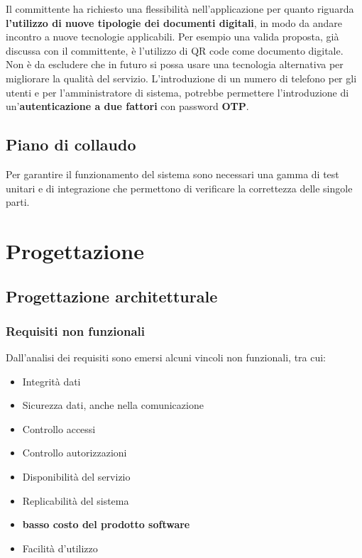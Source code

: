 \documentclass[a4paper]{article}
\begin{document}
Il committente ha richiesto una flessibilità nell'applicazione per quanto riguarda \textbf{l'utilizzo di nuove tipologie dei documenti digitali}, in modo da andare incontro a nuove tecnologie applicabili. Per esempio una valida proposta, già discussa con il committente, è l'utilizzo di QR code come documento digitale. Non è da escludere che in futuro si possa usare una tecnologia alternativa per migliorare la qualità del servizio. L'introduzione di un numero di telefono per gli utenti e per l'amministratore di sistema, potrebbe permettere l'introduzione di un'\textbf{autenticazione a due fattori} con password \textbf{OTP}.  

\newpage

\subsection{Piano di collaudo}

Per garantire il funzionamento del sistema sono necessari una gamma di test unitari e
di integrazione che permettono di verificare la correttezza delle singole parti.




\newpage

\section{Progettazione}

\subsection{Progettazione architetturale}

\subsubsection{Requisiti non funzionali}

Dall’analisi dei requisiti sono emersi alcuni vincoli non funzionali, tra cui:

\begin{itemize}
    \item Integrità dati
    \item Sicurezza dati, anche nella comunicazione
    \item Controllo accessi
    \item Controllo autorizzazioni
    \item Disponibilità del servizio
    \item Replicabilità del sistema
    \item \textbf{basso costo del prodotto software}
    \item Facilità d’utilizzo
\end{itemize}
\end{document}
